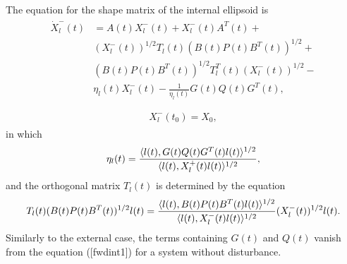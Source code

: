 \documentclass[letterpaper,10pt,english]{sphinxmanual}
\begin{document}
The equation for the shape matrix of the internal ellipsoid is
\label{chap_reach:equation-fwdint1}\begin{gather}
\begin{split}\dot{X}^-_l(t) & = A(t)X^-_l(t) + X^-_l(t)A^T(t) +\nonumber \\
& (X_l^{-}(t))^{1/2}T_l(t)(B(t)P(t)B^T(t))^{1/2} +\nonumber \\
& (B(t)P(t)B^T(t))^{1/2}T_l^T(t)(X_l^{-}(t))^{1/2} -\nonumber \\
& \eta_l(t)X^-_l(t) - \frac{1}{\eta_l(t)}G(t)Q(t)G^T(t), \\\end{split}\label{chap_reach-fwdint1}
\end{gather}\label{chap_reach:equation-fwdint2}\begin{gather}
\begin{split}X^-_l(t_0) = X_0,\end{split}\label{chap_reach-fwdint2}
\end{gather}
in which
\begin{gather}
\begin{split}\eta_l(t) = \frac{\langle l(t),
G(t)Q(t)G^T(t)l(t)\rangle^{1/2}}{\langle l(t), X^+_l(t)l(t)\rangle^{1/2}},\end{split}\notag
\end{gather}
and the orthogonal matrix $T_l(t)$ is determined by the equation
\begin{gather}
\begin{split}T_l(t)(B(t)P(t)B^T(t))^{1/2}l(t) = \frac{\langle l(t),
B(t)P(t)B^T(t)l(t)\rangle^{1/2}}{\langle l(t),
X_l^-(t)l(t)\rangle^{1/2}}(X_l^{-}(t))^{1/2}l(t).\end{split}\notag
\end{gather}
Similarly to the external case, the terms containing $G(t)$ and
$Q(t)$ vanish from the equation ({[}fwdint1{]}) for a system without
disturbance.
\end{document}

